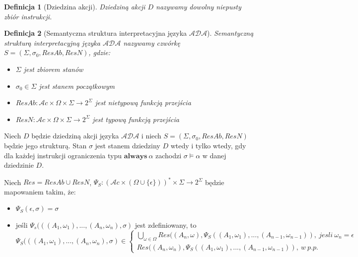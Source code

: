 \documentclass[11pt,a4paper]{article}
\newtheorem{definition}{Definicja}[section]
\begin{document}
    \begin{definition}[Dziedzina akcji]
    Dziedziną akcji $D$ nazywamy dowolny niepusty zbiór instrukcji.
    \end{definition}
    
    \begin{definition}[Semantyczna struktura interpretacyjna języka $\mathcal{ADA}$]
    Semantyczną strukturą interpretacyjną języka $\mathcal{ADA}$ nazywamy czwórkę $S=(\Sigma, \sigma_0, ResAb, ResN)$, gdzie:
    \begin{itemize}
        \item $\Sigma$ jest zbiorem stanów
        \item $\sigma_0 \in \Sigma$ jest stanem początkowym
        \item $ResAb: \mathcal{A}c \times \Omega \times \Sigma \rightarrow 2^\Sigma$ jest nietypową funkcją przejścia
        \item $ResN: \mathcal{A}c \times \Omega \times \Sigma \rightarrow 2^\Sigma$ jest typową funkcją przejścia
    \end{itemize}
    \end{definition}
    
    Niech $D$ będzie dziedziną akcji języka $\mathcal{ADA}$ i niech $S=(\Sigma, \sigma_0, ResAb, ResN)$ będzie jego strukturą. Stan $\sigma$ jest stanem dziedziny $D$ wtedy i tylko wtedy, gdy dla każdej instrukcji ograniczenia typu $\mathbf{always}~\alpha$ zachodzi $\sigma \models \alpha$ w danej dziedzinie $D$.
    
    Niech $Res = ResAb \cup ResN$, $\Psi_S: (\mathcal{A}c \times (\Omega \cup \{ \epsilon \}))^* \times \Sigma \rightarrow 2^\Sigma$ będzie mapowaniem takim, że:
    \begin{itemize}
        \item $\Psi_S(\epsilon, \sigma) = \sigma$
        \item jeśli $\Psi_s(((A_1, \omega_1), ..., (A_n, \omega_n), \sigma)$ jest zdefiniowany, to    
    \[
    \Psi_S(((A_1, \omega_1), ..., (A_n, \omega_n), \sigma) \in \left \{
        \begin{array}{ll}
             \bigcup\limits_{\omega \in \Omega} Res((A_n, \omega), \Psi_S((A_1, \omega_1), ..., (A_{n-1}, \omega_{n-1})),~jesli~\omega_n = \epsilon\\
             Res((A_n, \omega_n), \Psi_S((A_1, \omega_1), ..., (A_{n-1}, \omega_{n-1})),~w~p.p.
         \end{array}
     \right.
    \]
    \end{itemize}
    
\end{document}
